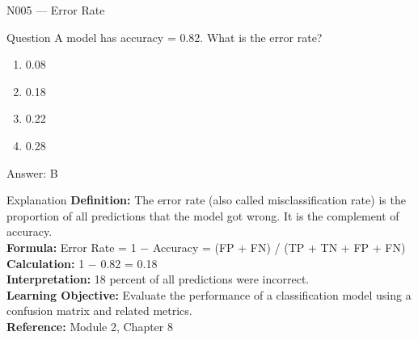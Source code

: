 \documentclass[aspectratio=169,8pt]{beamer}
\begin{document}
	\begin{frame}{N005 --- Error Rate}
		\begin{block}{Question}
			A model has accuracy = 0.82. What is the error rate?
			\begin{enumerate}
				\item 0.08
				\item 0.18
				\item 0.22
				\item 0.28
			\end{enumerate}
		\end{block}
		\begin{exampleblock}{Answer: B}\end{exampleblock}
		\begin{block}{Explanation}
			\textbf{Definition:} The error rate (also called misclassification rate) is the proportion of all predictions that the model got wrong. It is the complement of accuracy.\\
			\textbf{Formula:} Error Rate = 1 $-$ Accuracy = (FP + FN) / (TP + TN + FP + FN)\\
			\textbf{Calculation:} 1 $-$ 0.82 = 0.18\\
			\textbf{Interpretation:} 18 percent of all predictions were incorrect.\\
			\textbf{Learning Objective:} Evaluate the performance of a classification model using a confusion matrix and related metrics.\\
			\textbf{Reference:} Module 2, Chapter 8
		\end{block}
	\end{frame}
	
\end{document}
